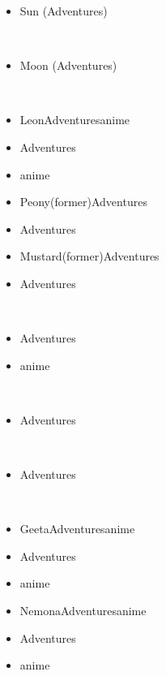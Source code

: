 \documentclass[a4paper,12pt]{article}
\begin{document}
\begin{itemize}
\item Sun (Adventures)
\end{itemize}\\ \par \vspace{0.5cm}

\begin{itemize}
\item Moon (Adventures)
\end{itemize}\\ \par \vspace{0.5cm}

\begin{itemize}
\item LeonAdventuresanime
\item Adventures
\item anime
\item Peony(former)Adventures
\item Adventures
\item Mustard(former)Adventures
\item Adventures
\end{itemize}\\ \par \vspace{0.5cm}

\begin{itemize}
\item Adventures
\item anime
\end{itemize}\\ \par \vspace{0.5cm}

\begin{itemize}
\item Adventures
\end{itemize}\\ \par \vspace{0.5cm}

\begin{itemize}
\item Adventures
\end{itemize}\\ \par \vspace{0.5cm}

\begin{itemize}
\item GeetaAdventuresanime
\item Adventures
\item anime
\item NemonaAdventuresanime
\item Adventures
\item anime
\end{itemize}\\ \par \vspace{0.5cm}
\end{document}
